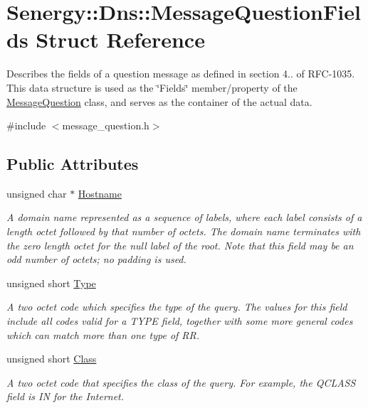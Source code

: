 \hypertarget{struct_senergy_1_1_dns_1_1_message_question_fields}{\section{Senergy\-:\-:Dns\-:\-:Message\-Question\-Fields Struct Reference}
\label{struct_senergy_1_1_dns_1_1_message_question_fields}
}


Describes the fields of a question message as defined in section 4.. of R\-F\-C-\/1035. This data structure is used as the \char`\"{}\-Fields\char`\"{} member/property of the \hyperlink{class_senergy_1_1_dns_1_1_message_question}{Message\-Question} class, and serves as the container of the actual data.  




{\ttfamily \#include $<$message\-\_\-question.\-h$>$}

\subsection*{Public Attributes}
\begin{DoxyCompactItemize}
\item 
unsigned char $\ast$ \hyperlink{struct_senergy_1_1_dns_1_1_message_question_fields_a0d4513020862cecabd53e86ba5d9e05d}{Hostname}
\begin{DoxyCompactList}\small\item\em A domain name represented as a sequence of labels, where each label consists of a length octet followed by that number of octets. The domain name terminates with the zero length octet for the null label of the root. Note that this field may be an odd number of octets; no padding is used. \end{DoxyCompactList}\item 
unsigned short \hyperlink{struct_senergy_1_1_dns_1_1_message_question_fields_a15156bfecd74744319a3ce51e3fd1800}{Type}
\begin{DoxyCompactList}\small\item\em A two octet code which specifies the type of the query. The values for this field include all codes valid for a T\-Y\-P\-E field, together with some more general codes which can match more than one type of R\-R. \end{DoxyCompactList}\item 
unsigned short \hyperlink{struct_senergy_1_1_dns_1_1_message_question_fields_a3287d0766033d31e14623d864348bd84}{Class}
\begin{DoxyCompactList}\small\item\em A two octet code that specifies the class of the query. For example, the Q\-C\-L\-A\-S\-S field is I\-N for the Internet. \end{DoxyCompactList}\end{DoxyCompactItemize}


